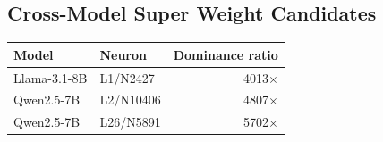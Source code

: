\documentclass[11pt]{article}
\begin{document}
\subsection{Cross-Model Super Weight Candidates}

\clearpage
\noindent
\centering
{}
\label{tab:superweights}

\small
\begin{tabular}{llr}
\toprule
\textbf{Model} & \textbf{Neuron} & \textbf{Dominance ratio} \\
\midrule
Llama-3.1-8B & L1/N2427  & 4013$\times$ \\
Qwen2.5-7B   & L2/N10406 & 4807$\times$ \\
Qwen2.5-7B   & L26/N5891 & 5702$\times$ \\
\bottomrule
\end{tabular}
\end{document}
